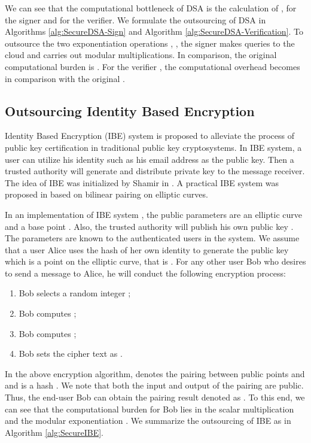 \documentclass[english,draftcls,onecolumn,11pt]{IEEEtran}
\theoremstyle{definition}
\theoremstyle{plain}
\theoremstyle{plain}
\theoremstyle{definition}
\begin{document}
We can see that the computational bottleneck of DSA is the calculation
of ,  for the signer and 
for the verifier. We formulate the outsourcing of DSA in Algorithms
\ref{alg:SecureDSA-Sign} and Algorithm \ref{alg:SecureDSA-Verification}.
To outsource the two exponentiation operations , ,
the signer  makes  queries to the cloud and carries out 
modular multiplications. In comparison, the original computational
burden is . For the verifier
, the computational overhead becomes  in
comparison with the original . 


\subsection{Outsourcing Identity Based Encryption}

Identity Based Encryption (IBE) system is proposed to alleviate the
process of public key certification in traditional public key cryptosystems.
In IBE system, a user can utilize his identity such as his email address\textit{
}as the public key. Then a trusted authority will generate and distribute
private key to the message receiver. The idea of IBE was initialized
by Shamir in \cite{shamir1985identity}. A practical IBE system was
proposed in \cite{boneh2001identity} based on bilinear pairing on
elliptic curves.

In an implementation of IBE system \cite[Chapter 5]{hoffstein2008introduction},
the public parameters are an elliptic curve 
and a base point . Also, the trusted authority
will publish his own public key .
The parameters are known to the authenticated users in the system.
We assume that a user Alice uses the hash of her own identity to generate
the public key which is a point on the elliptic curve, that is .
For any other user Bob who desires to send a message  to Alice,
he will conduct the following encryption process:
\begin{enumerate}
\item Bob selects a random integer ;
\item Bob computes ;
\item Bob computes ;
\item Bob sets the cipher text as .
\end{enumerate}
In the above encryption algorithm,  denotes the pairing
between public points  and  and  is a hash
. We note that both the input and output of the pairing 
are public. Thus, the end-user Bob can obtain the pairing result denoted
as . To this end, we can see that the computational
burden for Bob lies in the scalar multiplication  and the modular
exponentiation . We summarize the outsourcing of IBE
as in Algorithm \ref{alg:SecureIBE}.
\end{document}
